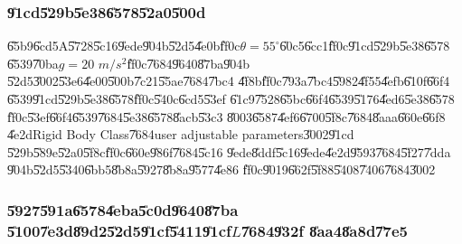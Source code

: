 \subsubsection{\U{91cd}\U{529b}\U{5e38}\U{6578}\U{52a0}\U{500d}}

\U{65b9}\U{6cd5}A\U{5728}\U{5c16}\U{9ede}\U{904b}\U{52d5}\U{4e0b}\U{ff0c}$%
\theta =55^{\circ }$\U{60c5}\U{6cc1}\U{ff0c}\U{91cd}\U{529b}\U{5e38}\U{6578}%
\U{6539}\U{70ba}$g=20$ $m/s^{2}$\U{ff0c}\U{7684}\U{9640}\U{87ba}\U{904b}%
\U{52d5}\U{3002}\U{53e6}\U{4e00}\U{500b}\U{7c21}\U{55ae}\U{7684}\U{7bc4}%
\U{4f8b}\U{ff0c}\U{793a}\U{7bc4}\U{5982}\U{4f55}\U{4efb}\U{610f}\U{66f4}%
\U{6539}\U{91cd}\U{529b}\U{5e38}\U{6578}\U{ff0c}\U{540c}\U{6cd5}\U{53ef}%
\U{61c9}\U{7528}\U{65bc}\U{66f4}\U{6539}\U{5176}\U{4ed6}\U{5e38}\U{6578}%
\U{ff0c}\U{53ef}\U{66f4}\U{6539}\U{7684}\U{5e38}\U{6578}\U{8acb}\U{53c3}%
\U{8003}\U{6587}\U{4ef6}\U{6700}\U{5f8c}\U{7684}\U{8aaa}\U{660e}\U{66f8}%
\U{4e2d}Rigid Body Class\U{7684}user adjustable parameters\U{3002}\U{91cd}%
\U{529b}\U{589e}\U{52a0}\U{5f8c}\U{ff0c}\U{660e}\U{986f}\U{7684}\U{5c16}%
\U{9ede}\U{8ddf}\U{5c16}\U{9ede}\U{4e2d}\U{9593}\U{7684}\U{5f27}\U{7dda}%
\U{904b}\U{52d5}\U{5340}\U{6bb5}\U{8b8a}\U{5927}\U{8b8a}\U{9577}\U{4e86}%
\U{ff0c}\U{9019}\U{662f}\U{5f88}\U{5408}\U{7406}\U{7684}\U{3002}

%
\begin{center}

\end{center}%

\subsubsection{\U{5927}\U{591a}\U{6578}\U{4eba}\U{5c0d}\U{9640}\U{87ba}%
\U{5100}\U{7e3d}\U{89d2}\U{52d5}\U{91cf}\U{5411}\U{91cf}$L$\U{7684}\U{932f}%
\U{8aa4}\U{8a8d}\U{77e5}}

